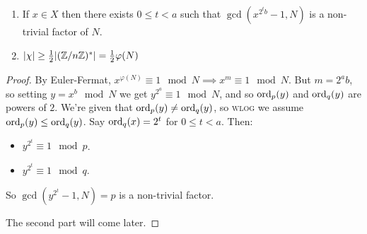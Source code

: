 \documentclass[10pt,a4paper]{article}
\begin{document}
\begin{theorem}
\item
\begin{enumerate}
\item If $x \in X$ then there exists $0 \leq t < a$ such that $\gcd(x^{2^t b}-1, N)$ is a non-trivial factor of $N$.
\item $|\chi| \geq \frac{1}{2}|(\mathbb{Z}/n\mathbb{Z})^\ast| = \frac12 \varphi(N)$
\end{enumerate}
\end{theorem}
\begin{proof}
By Euler-Fermat, $x^{\varphi(N)}\equiv 1 \mod N \implies x^m \equiv 1 \mod N$. But $m = 2^a b$, so setting $y = x^b \mod N$ we get $y^{2^a} \equiv 1 \mod N$, and so $\operatorname{ord}_p(y)$ and $\operatorname{ord}_q(y)$ are powers of $2$. We're given that $\operatorname{ord}_p(y) \neq \operatorname{ord}_q(y)$, so \textsc{wlog} we assume $\operatorname{ord}_p(y) \leq \operatorname{ord}_q(y)$. Say $\operatorname{ord}_q(x) = 2^t$ for $0\leq t <a$. Then:
\begin{itemize}
\item $y^{2^t} \equiv 1 \mod p$.
\item $y^{2^t} \equiv 1 \mod q$.
\end{itemize}
So $\gcd(y^{2^t}-1, N) = p$ is a non-trivial factor.

The second part will come later.
\end{proof}
\end{document}
